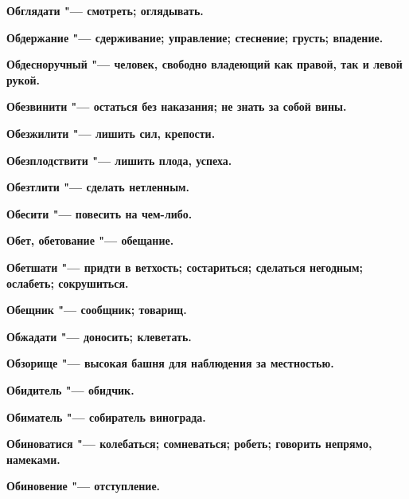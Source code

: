 \begin{mymulticols}{2}
\bfseries Обглядати\normalfont{} "--- смотреть; оглядывать. 




\bfseries Обдержание\normalfont{} "--- сдерживание; управление; стеснение; грусть; впадение. 




\bfseries Обдесноручный\normalfont{} "--- человек, свободно владеющий как правой, так и левой рукой. 




\bfseries Обезвинити\normalfont{} "--- остаться без наказания; не знать за собой вины. 




\bfseries Обезжилити\normalfont{} "--- лишить сил, крепости. 




\bfseries Обезплодствити\normalfont{} "--- лишить плода, успеха. 




\bfseries Обезтлити\normalfont{} "--- сделать нетленным. 




\bfseries Обесити\normalfont{} "--- повесить на чем-либо. 




\bfseries Обет, обетование\normalfont{} "--- обещание. 




\bfseries Обетшати\normalfont{} "--- придти в ветхость; состариться; сделаться негодным; ослабеть; сокрушиться. 




\bfseries Обещник\normalfont{} "--- сообщник; товарищ. 




\bfseries Обжадати\normalfont{} "--- доносить; клеветать. 




\bfseries Обзорище\normalfont{} "--- высокая башня для наблюдения за местностью. 




\bfseries Обидитель\normalfont{} "--- обидчик. 




\bfseries Обиматель\normalfont{} "--- собиратель винограда. 




\bfseries Обиноватися\normalfont{} "--- колебаться; сомневаться; робеть; говорить непрямо, намеками. 




\bfseries Обиновение\normalfont{} "--- отступление. 





\end{mymulticols}
